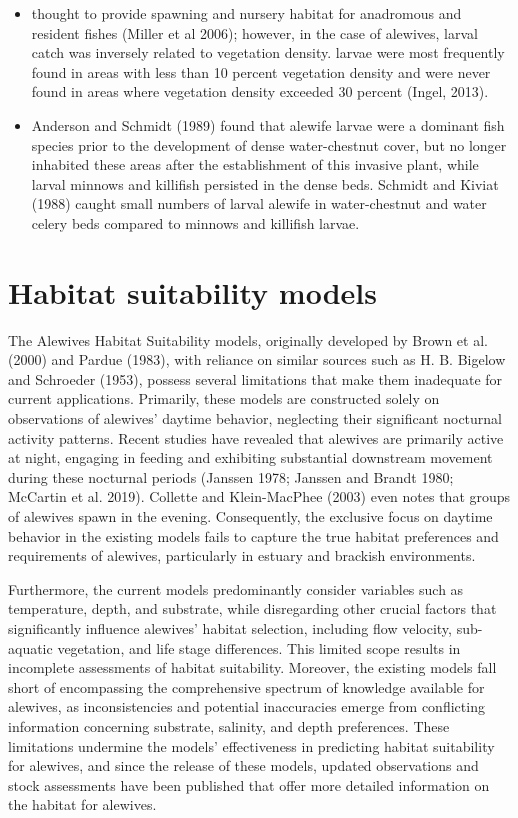 \documentclass[
]{book}
\begin{document}
\begin{itemize}
\item
  thought to provide spawning and nursery habitat for anadromous and resident fishes (Miller et al 2006); however, in the case of alewives, larval catch was inversely related to vegetation density. larvae were most frequently found in areas with less than 10 percent vegetation density and were never found in areas where vegetation density exceeded 30 percent (Ingel, 2013).
\item
  Anderson and Schmidt (1989) found that alewife larvae were a dominant fish species prior to the development of dense water-chestnut cover, but no longer inhabited these areas after the establishment of this invasive plant, while larval minnows and killifish persisted in the dense beds. Schmidt and Kiviat (1988) caught small numbers of larval alewife in water-chestnut and water celery beds compared to minnows and killifish larvae.
\end{itemize}

\hypertarget{habitat-suitability-models}{%
\section{Habitat suitability models}\label{habitat-suitability-models}}

The Alewives Habitat Suitability models, originally developed by Brown et al. (2000) and Pardue (1983), with reliance on similar sources such as H. B. Bigelow and Schroeder (1953), possess several limitations that make them inadequate for current applications.
Primarily, these models are constructed solely on observations of alewives' daytime behavior, neglecting their significant nocturnal activity patterns.
Recent studies have revealed that alewives are primarily active at night, engaging in feeding and exhibiting substantial downstream movement during these nocturnal periods (Janssen 1978; Janssen and Brandt 1980; McCartin et al. 2019).
Collette and Klein-MacPhee (2003) even notes that groups of alewives spawn in the evening.
Consequently, the exclusive focus on daytime behavior in the existing models fails to capture the true habitat preferences and requirements of alewives, particularly in estuary and brackish environments.

Furthermore, the current models predominantly consider variables such as temperature, depth, and substrate, while disregarding other crucial factors that significantly influence alewives' habitat selection, including flow velocity, sub-aquatic vegetation, and life stage differences.
This limited scope results in incomplete assessments of habitat suitability.
Moreover, the existing models fall short of encompassing the comprehensive spectrum of knowledge available for alewives, as inconsistencies and potential inaccuracies emerge from conflicting information concerning substrate, salinity, and depth preferences.
These limitations undermine the models' effectiveness in predicting habitat suitability for alewives, and since the release of these models, updated observations and stock assessments have been published that offer more detailed information on the habitat for alewives.
\end{document}

